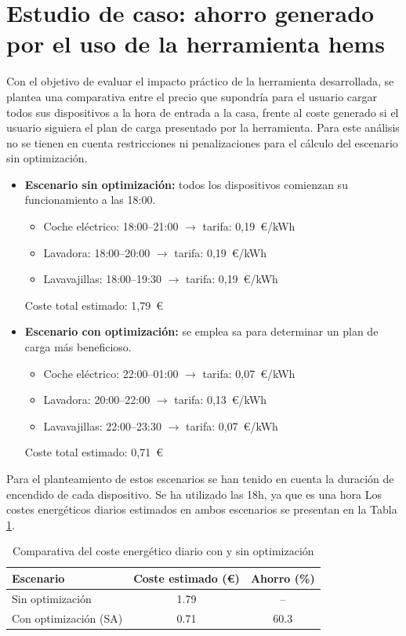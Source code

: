 \documentclass[11pt,a4paper]{book}
\begin{document}
\section{Estudio de caso: ahorro generado por el uso de la herramienta \gls{hems}}
Con el objetivo de evaluar el impacto práctico de la herramienta desarrollada, se plantea una comparativa entre el precio que supondría para el usuario cargar todos sus dispositivos a la hora de entrada a la casa, frente al coste generado si el usuario siguiera el plan de carga presentado por la herramienta. Para este análisis no se tienen en cuenta restricciones ni penalizaciones para el cálculo del escenario sin optimización.

\begin{itemize}
    \item \textbf{Escenario sin optimización:} todos los dispositivos comienzan su funcionamiento a las 18:00.

    \begin{itemize}
        \item Coche eléctrico: 18:00–21:00 \(\rightarrow\) tarifa: 0{,}19~\euro{}/kWh
        \item Lavadora: 18:00–20:00 \(\rightarrow\) tarifa: 0{,}19~\euro{}/kWh
        \item Lavavajillas: 18:00–19:30 \(\rightarrow\) tarifa: 0{,}19~\euro{}/kWh
    \end{itemize}
    \noindent Coste total estimado: 1{,}79~\euro{}
    \item \textbf{Escenario con optimización:} se emplea \gls{sa} para determinar un plan de carga más beneficioso.
    \begin{itemize}
        \item Coche eléctrico: 22:00–01:00 \(\rightarrow\) tarifa: 0{,}07~\euro{}/kWh
        \item Lavadora: 20:00–22:00 \(\rightarrow\) tarifa: 0{,}13~\euro{}/kWh
        \item Lavavajillas: 22:00–23:30 \(\rightarrow\) tarifa: 0{,}07~\euro{}/kWh
    \end{itemize}
    \noindent Coste total estimado: 0{,}71~\euro{}
\end{itemize}
Para el planteamiento de estos escenarios se han tenido en cuenta la duración de encendido de cada dispositivo. Se ha utilizado las 18h, ya que es una hora Los costes energéticos diarios estimados en ambos escenarios se presentan en la Tabla \ref{tab:estudio_caso_coste}.

\begin{table}[H]
    \centering
    \caption{Comparativa del coste energético diario con y sin optimización}
    \label{tab:estudio_caso_coste}
    \begin{tabular}{lcc}
        \toprule
        \textbf{Escenario} & \textbf{Coste estimado (\euro{})} & \textbf{Ahorro (\%)} \\
        \midrule
        Sin optimización      & 1.79 & -- \\
        Con optimización (SA) & 0.71 & 60.3 \\
        \bottomrule
    \end{tabular}
\end{table}
\end{document}
